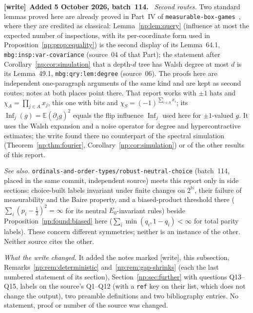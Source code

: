 \documentclass[11pt,a4paper]{article}
\theoremstyle{definition}
\theoremstyle{remark}
\newcommand{\N}{\mathbb N}
\newcommand{\E}{\mathbb E}
\newcommand{\Inf}{\operatorname{Inf}}
\newcommand{\file}[1]{\nolinkurl{#1}}
\newenvironment{writenote}[1][]{\par\smallskip\begingroup\small
 \noindent\textbf{[write]}\if\relax\detokenize{#1}\relax\else~\textbf{#1.}\fi\ }%
 {\par\endgroup\smallskip}
\begin{document}
\begin{writenote}[Added 5 October 2026, batch~114]
\emph{Second routes.} Two standard lemmas proved here are already proved
in Part~IV of \file{measurable-box-games}~\cite{repoboxart}, where they are
credited as classical: Lemma~\ref{np:lem:query} (influence at most the
expected number of inspections, with its per-coordinate form used in
Proposition~\ref{np:prop:equality}) is the second display of its
Lemma~64.1, \file{mbg:insp:var-covariance} (source~04 of that Part); the
statement after Corollary~\ref{np:cor:simulation} that a depth-$d$ tree
has Walsh degree at most $d$ is its Lemma~49.1, \file{mbg:qry:lem:degree}
(source~06). The proofs here are independent one-paragraph arguments of the
same kind and are kept as second routes; notes at both places point there.
That report works with $\pm1$ hats and $\chi_A=\prod_{j\in A}x_j$, this one
with bits and $\chi_S=(-1)^{\sum_{i\in S}x_i}$; its $\Inf_j(g)=
\E(\partial_jg)^2$ equals the flip influence $\Inf_j$ used here for
$\pm1$-valued $g$. It uses the Walsh expansion and a noise operator for
degree and hypercontractive estimates; the write found there no counterpart
of the spectral simulation (Theorem~\ref{np:thm:fourier},
Corollary~\ref{np:cor:simulation}) or of the other results of this report.

\emph{See also.} \file{ordinals-and-order-types/robust-neutral-choice}
(batch~114, placed in the same commit, independent source) meets this report
only in side sections: choice-built labels invariant under finite changes on
$2^{\N}$, their failure of measurability and the Baire property, and a
biased-product threshold there
($\sum_i(p_i-\tfrac12)^2=\infty$ for its neutral $E_0$-invariant rules)
beside Proposition~\ref{np:found:biased} here
($\sum_i\min(q_i,1-q_i)<\infty$ for total parity labels). These concern
different symmetries; neither is an instance of the other. Neither source
cites the other.

\emph{What the write changed.} It added the notes marked [write], this
subsection, Remarks~\ref{np:rem:deterministic} and~\ref{np:rem:gap-shrinks}
(each the last numbered statement of its section),
Section~\ref{np:sec:further} with questions Q13--Q15, labels on the source's
Q1--Q12 (with a \texttt{ref} key on their list, which does not
change the output), two preamble definitions and two bibliography entries.
No statement, proof or number of the source was changed.


\end{writenote}
\end{document}
